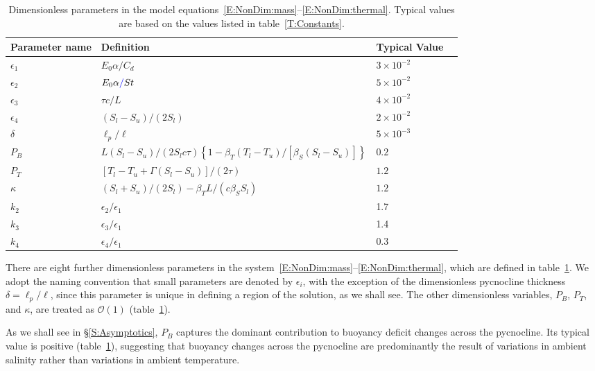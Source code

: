 \documentclass[openacc]{rsproca_new}%
\newcommand{\order}[1]{\mathcal{O}(#1)}
\newcommand{\blue}[1]{{\color{blue} #1}}
\newcommand{\epsone}{\epsilon_{1}} %
\newcommand{\epstwo}{\epsilon_{2}} %
\newcommand{\epsthree}{\epsilon_{3}} %
\newcommand{\epsfour}{\epsilon_{4}}
\newcommand{\Pb}{\textit{P}_B}  %
\newcommand{\lt}{\delta} %
\newcommand{\Pt}{\textit{P}_T}
\begin{document}
\begin{table}[!h]
\caption{Dimensionless parameters in the model equations~\eqref{E:NonDim:mass}--\eqref{E:NonDim:thermal}. Typical values are based on the values listed in table~\ref{T:Constants}.}\label{T:Dimensionless_Parameters}
\begin{center}
\begin{tabular}{llll}
Parameter name  & Definition   & Typical Value \\
\hline 
\vspace{2pt}
$\epsone$ & $  E_0 \alpha /C_d $  &$ 3 \times 10^{-2}$ \\
$\epstwo$ & $  E_0 \alpha \blue{/}St $ & $ 5 \times 10^{-2}$ \\
$\epsthree$ & $  \tau c / L $ & $ 4 \times 10^{-2}$ \\
$\epsfour$ & $  (S_l - S_u)/(2 S_l) $  &$ 2 \times 10^{-2}$ \\
$\lt$ & $  \ell_p / \ell $ & $  5 \times 10^{-3}$ \\
$\Pb$ & $  L (S_l - S_u)/(2S_l c \tau)\left\{1 - \beta_T (T_l - T_u)/\left[\beta_S (S_l - S_u)\right]\right\}$   & $  0.2$ \\
$\Pt$ & $ \left[T_l - T_u + \Gamma( S_l - S_u)\right]/(2 \tau)$ & $  1.2$ \\
$\kappa$ & $ (S_l + S_u)/(2S_l) -  \beta_T L / (c \beta_S S_l)$ &  $  1.2$ \\
\hline
$k_2$ & $\epstwo/\epsone$ & 1.7\\
$k_3$ & $\epsthree / \epsone$ & 1.4\\
$k_4$ & $\epsfour/ \epsone$ & 0.3\\
\end{tabular}
\end{center}
\end{table}
 
There are eight further dimensionless parameters in the system~\eqref{E:NonDim:mass}--\eqref{E:NonDim:thermal}, which are defined in table~\ref{T:Dimensionless_Parameters}. We adopt the naming convention that small parameters are denoted by $\epsilon_i$, with the exception of the dimensionless pycnocline thickness $\delta = \ell_p / \ell$, since this parameter is unique in defining a region of the solution, as we shall see. The other dimensionless variables, $\Pb$, $\Pt$, and $\kappa$, are treated as $\order{1}$ (table~\ref{T:Dimensionless_Parameters}).

As we shall see in \S\ref{S:Asymptotics}, $\Pb$ captures the dominant contribution to buoyancy deficit changes across the pycnocline. Its typical value is positive (table~\ref{T:Dimensionless_Parameters}), suggesting that buoyancy changes across the pycnocline are predominantly the result of variations in ambient salinity rather than variations in ambient temperature.
\end{document}
